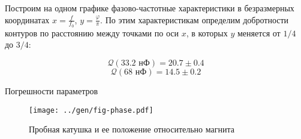 Построим на одном графике фазово-частотные характеристики в безразмерных координатах $x = \frac{f}{f_0}$, $y = \frac{\varphi}{\pi}$. По этим характеристикам определим добротности контуров по расстоянию между точками по оси $x$, в которых $y$ меняется от $1/4$ до $3/4$:

$$\mathcal{Q}\left(33.2 \text{ нФ}\right) = 20.7 \pm 0.4$$
$$\mathcal{Q}\left(68 \text{ нФ}\right) = 14.5 \pm 0.2$$


\begin{table}[H]
	\centering
	\footnotesize
	\caption{Погрешности параметров}
	
	\label{tab:norm}
\end{table}



\begin{figure}[H]
	\centering
	\texttt{[image: ../gen/fig-phase.pdf]}
	\caption{Пробная катушка и ее положение относительно магнита}
\end{figure}
